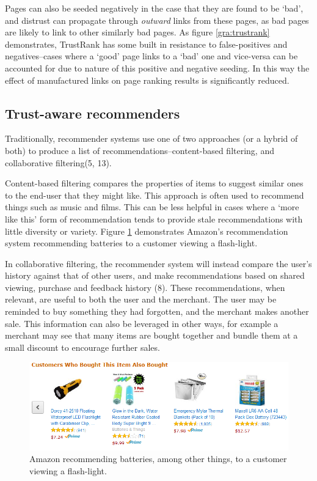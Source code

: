 \documentclass[]{final_report}
\begin{document}
Pages can also be seeded negatively in the case that they are found to be `bad', and distrust can propagate through \textsl{outward} links from these pages, as bad pages are likely to link to other similarly bad pages. As figure \ref{gra:trustrank} demonstrates, TrustRank has some built in resistance to false-positives and negatives--cases where a `good' page links to a `bad' one and vice-versa can be accounted for due to nature of this positive and negative seeding. In this way the effect of manufactured links on page ranking results is significantly reduced.

\subsection{Trust-aware recommenders}

Traditionally, recommender systems use one of two approaches (or a hybrid of both) to produce a list of recommendations--content-based filtering, and collaborative filtering(5, 13). 

Content-based filtering compares the properties of items to suggest similar ones to the end-user that they might like. This approach is often used to recommend things such as music and films. This can be less helpful in cases where a `more like this' form of recommendation tends to provide stale recommendations with little diversity or variety. Figure \ref{gra:amazon} demonstrates Amazon's recommendation system recommending batteries to a customer viewing a flash-light.

In collaborative filtering, the recommender system will instead compare the user's history against that of other users, and make recommendations based on shared viewing, purchase and feedback history (8). These recommendations, when relevant, are useful to both the user and the merchant. The user may be reminded to buy something they had forgotten, and the merchant makes another sale. This information can also be leveraged in other ways, for example a merchant may see that many items are bought together and bundle them at a small discount to encourage further sales.

\begin{figure}[ht!]
\centering
\includegraphics[width=140mm]{chap2/recommender.PNG}
\caption{Amazon recommending batteries, among other things, to a customer viewing a flash-light.}
\label{gra:amazon}
\end{figure}
\end{document}
